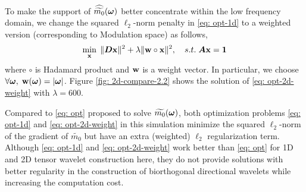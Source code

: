 To make the support of $\widehat{\widetilde{m_{0}}}(\boldsymbol{\omega})$ better concentrate within the low frequency domain, we change the squared $\ell_2$-norm penalty in \eqref{eq: opt-1d} to a weighted version (corresponding to Modulation space) as follows,
\begin{align}
\min_{\mathbf{x}}\; \Vert\boldsymbol{ D}\mathbf{x}\Vert^2 + \lambda\Vert \mathbf{w}\circ\mathbf{x}\Vert^2,\quad s.t. \; \boldsymbol{A}\mathbf{x} = \mathbf{1} \label{eq: opt-2d-weight}
\end{align} 
where $\circ$ is Hadamard product and $\mathbf{w}$ is a weight vector. In particular, we choose $\forall \boldsymbol{\omega}, \; \mathbf{w}(\boldsymbol{\omega}) = |\boldsymbol{\omega}|$. Figure \ref{fig: 2d-compare-2.2} shows the solution of \eqref{eq: opt-2d-weight} with $\lambda=600$. %

Compared to \eqref{eq: opt} proposed to solve $\widetilde{m_{0}}(\boldsymbol{\omega})$, both optimization problems \eqref{eq: opt-1d} and \eqref{eq: opt-2d-weight} in this simulation minimize the squared $\ell_2$-norm of the gradient of $\widetilde{m_0}$ but have an extra (weighted) $\ell_2$ regularization term. Although \eqref{eq: opt-1d} and \eqref{eq: opt-2d-weight} work better than \eqref{eq: opt} for 1D and 2D tensor wavelet construction here, they do not provide solutions with better regularity in the construction of biorthogonal directional wavelets while increasing the computation cost.

\begin{comment}
\begin{minipage}{.9\textwidth}
\centering
\texttt{[image: 2d-m-compare-2-1-eps-converted-to.pdf]}\\
\texttt{[image: 2d-filter-compare-2-1-eps-converted-to.pdf]}
\captionof{figure}{result of \eqref{eq: opt-2d-weight} $\mhat{0}$ ($\lambda = 60$), target $\m{0}$ and their difference, Top: frequency domain, Bottom: time domain}
\label{fig: 2d-compare-2}
\end{minipage}
\end{comment}

